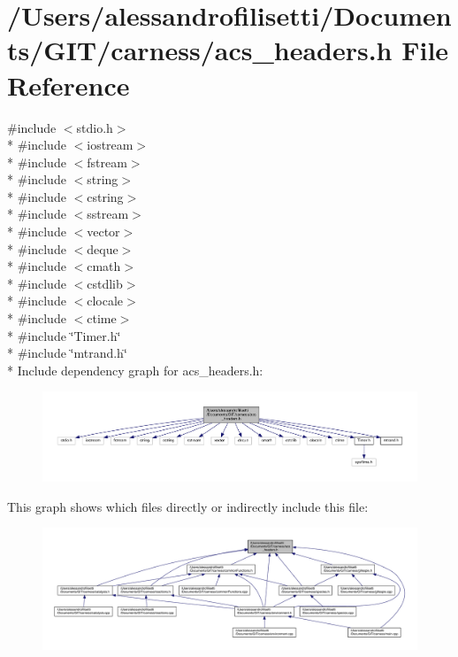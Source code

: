 \hypertarget{a00051}{\section{/\+Users/alessandrofilisetti/\+Documents/\+G\+I\+T/carness/acs\+\_\+headers.h File Reference}
\label{a00051}
}
{\ttfamily \#include $<$stdio.\+h$>$}\\*
{\ttfamily \#include $<$iostream$>$}\\*
{\ttfamily \#include $<$fstream$>$}\\*
{\ttfamily \#include $<$string$>$}\\*
{\ttfamily \#include $<$cstring$>$}\\*
{\ttfamily \#include $<$sstream$>$}\\*
{\ttfamily \#include $<$vector$>$}\\*
{\ttfamily \#include $<$deque$>$}\\*
{\ttfamily \#include $<$cmath$>$}\\*
{\ttfamily \#include $<$cstdlib$>$}\\*
{\ttfamily \#include $<$clocale$>$}\\*
{\ttfamily \#include $<$ctime$>$}\\*
{\ttfamily \#include \char`\"{}Timer.\+h\char`\"{}}\\*
{\ttfamily \#include \char`\"{}mtrand.\+h\char`\"{}}\\*
Include dependency graph for acs\+\_\+headers.\+h\+:\nopagebreak
\begin{figure}[H]
\begin{center}
\leavevmode
\includegraphics[width=350pt]{a00164}
\end{center}
\end{figure}
This graph shows which files directly or indirectly include this file\+:\nopagebreak
\begin{figure}[H]
\begin{center}
\leavevmode
\includegraphics[width=350pt]{a00165}
\end{center}
\end{figure}

